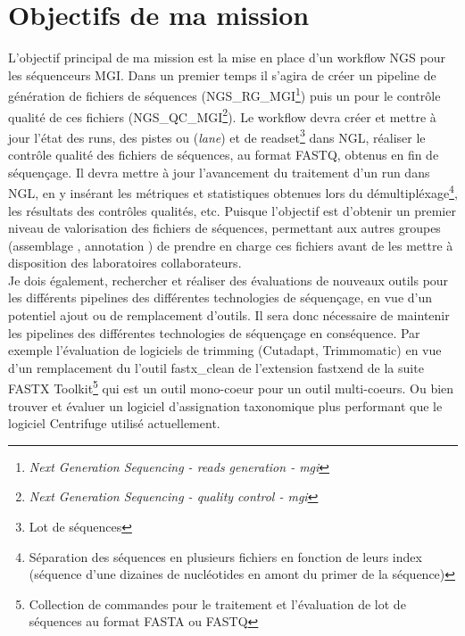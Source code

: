 \section{Objectifs de ma mission}
L'objectif principal de ma mission est la mise en place d'un workflow NGS pour les séquenceurs MGI. Dans un premier temps il s'agira de créer un pipeline de génération de fichiers de séquences (NGS\_RG\_MGI\footnote{\emph{Next Generation Sequencing - reads generation - mgi}}) puis un pour le contrôle qualité de ces fichiers (NGS\_QC\_MGI\footnote{\emph{Next Generation Sequencing - quality control - mgi}}). Le workflow devra créer et mettre à jour l'état des runs, des pistes ou (\emph{lane}) et de readset\footnote{Lot de séquences} dans NGL, réaliser le contrôle qualité des fichiers de séquences, au format FASTQ, obtenus en fin de séquençage. Il devra mettre à jour l'avancement du traitement d'un run dans NGL, en y insérant les métriques et statistiques obtenues lors du démultipléxage\footnote{Séparation des séquences en plusieurs fichiers en fonction de leurs index (séquence d'une dizaines de nucléotides en amont du primer de la séquence)}, les résultats des contrôles qualités, etc. Puisque l'objectif est d'obtenir un premier niveau de valorisation des fichiers de séquences, permettant aux autres groupes (\og assemblage \fg{}, \og annotation \fg{}) de prendre en charge ces fichiers avant de les mettre à disposition des laboratoires collaborateurs.\\

Je dois également, rechercher et réaliser des évaluations de nouveaux outils pour les différents pipelines des différentes technologies de séquençage, en vue d'un potentiel ajout ou de remplacement d'outils. Il sera donc nécessaire de maintenir les pipelines des différentes technologies de séquençage en conséquence. Par exemple l'évaluation de logiciels de trimming (Cutadapt, Trimmomatic) en vue d'un remplacement du l'outil fastx\_clean de l'extension fastxend de la suite FASTX Toolkit\footnote{Collection de commandes pour le traitement et l'évaluation de lot de séquences au format FASTA ou FASTQ} qui est un outil mono-coeur pour un outil multi-coeurs. Ou bien trouver et évaluer un logiciel d'assignation taxonomique plus performant que le logiciel Centrifuge utilisé actuellement.